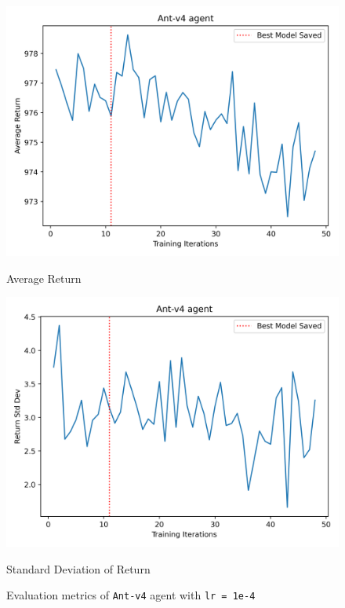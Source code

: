 \begin{figure}[H]
\centering
\begin{minipage}{0.45\textwidth}
    \centering
    \includegraphics[width=\linewidth]{plots/Ant-v4_avg_return-small-lr.png}
    \caption*{Average Return}
\end{minipage}
\hspace{0.02\textwidth}
\begin{minipage}{0.45\textwidth}
    \centering
    \includegraphics[width=\linewidth]{plots/Ant-v4_std_return-small-lr.png}
    \caption*{Standard Deviation of Return}
\end{minipage}
\caption{Evaluation metrics of \texttt{Ant-v4} agent with \texttt{lr = 1e-4}}
\label{fig:ant-small-lr}
\end{figure}


